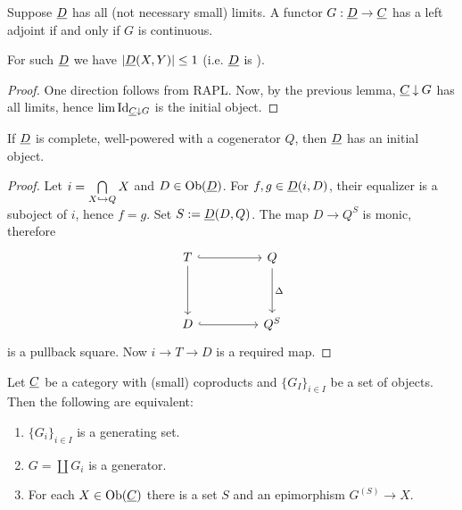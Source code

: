 \begin{theorem*}
	Suppose \( \underline{D} \) has all (not necessary small) limits. A functor \( G: \underline{D} \to \underline{C} \) has a left adjoint if and only if \( G \) is continuous.
\end{theorem*}

\begin{remark*}
	For such \( \underline{D} \) we have \( |\underline{D}(X, Y)| \le 1 \) (i.e. \( \underline{D} \) is ).
\end{remark*}
\begin{proof}
	One direction follows from RAPL. Now, by the previous lemma, \( \underline{C} \mathbin{\downarrow} G \) has all limits, hence \( \lim \mathrm{Id}_{\underline{C} \mathbin{\downarrow} G} \) is the initial object.
\end{proof}

\begin{lemma*}
	If \( \underline{D} \) is complete, well-powered with a cogenerator \( Q \), then \( \underline{D} \) has an initial object.
\end{lemma*}
\begin{proof}
	Let \( i = \bigcap\limits_{X \hookrightarrow Q} X \) and \( D \in \operatorname{Ob}(\underline{D}) \). For \( f, g \in \underline{D}(i, D) \), their equalizer is a suboject of \( i \), hence \( f = g \). Set \( S := \underline{D}(D, Q) \). The map \( D \to Q^S \) is monic, therefore
	\[
		\begin{tikzcd}
			T && Q \\
			\\
			D && {Q^S}
			\arrow[hook, from=1-1, to=1-3]
			\arrow[from=1-1, to=3-1]
			\arrow["\Delta", from=1-3, to=3-3]
			\arrow[hook, from=3-1, to=3-3]
		\end{tikzcd}
	\]
	is a pullback square. Now \( i \to T \to D \) is a required map.
\end{proof}

\begin{proposition*}
	Let \( \underline{C} \) be a category with (small) coproducts and \( \{G_I\}_{i \in I} \) be a set of objects. Then the following are equivalent:
	\begin{enumerate}
		\item \( \{G_i\}_{i \in I} \) is a generating set.
		\item \( G = \coprod G_i \) is a generator.
		\item For each \( X \in \operatorname{Ob}(\underline{C}) \) there is a set \( S \) and an epimorphism \( G^{(S)} \to X \).
	\end{enumerate}
\end{proposition*}

